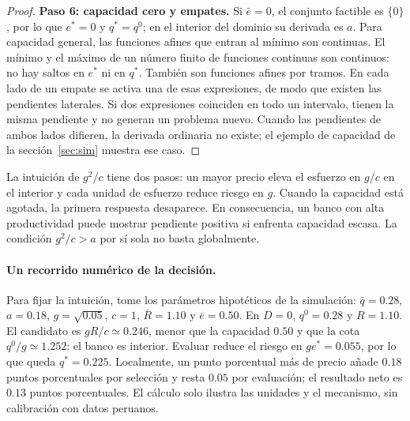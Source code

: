 \documentclass[11pt]{article}
\theoremstyle{definition}\newtheorem{assumption}{Supuesto}
\begin{document}
\begin{proof}
\textbf{Paso 6: capacidad cero y empates.}
Si $\bar e=0$, el conjunto factible es $\{0\}$, por lo que $e^*=0$ y
$q^*=q^0$; en el interior del dominio su derivada es $a$. Para capacidad
general, las funciones afines que entran al mínimo son continuas. El mínimo
y el máximo de un número finito de funciones continuas son continuos: no
hay saltos en $e^*$ ni en $q^*$. También son funciones afines por tramos.
En cada lado de un empate se activa una de esas expresiones, de modo que
existen las pendientes laterales. Si dos expresiones coinciden en todo un
intervalo, tienen la misma pendiente y no generan un problema nuevo. Cuando
las pendientes de ambos lados difieren, la derivada ordinaria no existe;
el ejemplo de capacidad de la sección~\ref{sec:sim} muestra ese caso.
\end{proof}

La intuición de $g^2/c$ tiene dos pasos: un mayor precio eleva el esfuerzo en
$g/c$ en el interior y cada unidad de esfuerzo reduce riesgo en $g$. Cuando
la capacidad está agotada, la primera respuesta desaparece. En consecuencia,
un banco con alta productividad puede mostrar pendiente positiva si enfrenta
capacidad escasa. La condición $g^2/c>a$ por sí sola no basta globalmente.

\paragraph{Un recorrido numérico de la decisión.}
Para fijar la intuición, tome los parámetros hipotéticos de la simulación:
$\bar q=0.28$, $a=0.18$, $g=\sqrt{0.05}$, $c=1$, $\bar R=1.10$ y
$\bar e=0.50$. En $D=0$, $q^0=0.28$ y $R=1.10$. El candidato es
$gR/c\simeq0.246$, menor que la capacidad $0.50$ y que la cota
$q^0/g\simeq1.252$: el banco es interior. Evaluar reduce el riesgo en
$ge^*=0.055$, por lo que queda $q^*=0.225$. Localmente, un punto porcentual
más de precio añade $0.18$ puntos porcentuales por selección y resta $0.05$
por evaluación; el resultado neto es $0.13$ puntos porcentuales. El cálculo
solo ilustra las unidades y el mecanismo, sin calibración con datos peruanos.
\end{document}
